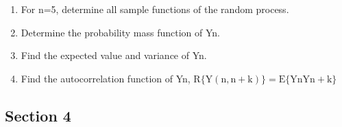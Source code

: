 \documentclass[main.tex]{subfiles}
\begin{document}
\begin{enumerate}
    \begin{enumerate}
        \item For n=5, determine all sample functions of the random process.
        \item Determine the probability mass function of Yn.
        \item Find the expected value and variance of Yn.
        \item Find the autocorrelation function of Yn, $\mathrm{R}\{\mathrm{Y}(\mathrm{n}, \mathrm{n}+\mathrm{k})\}=\mathrm{E}\{\mathrm{Yn} \mathrm{Yn}+\mathrm{k}\}$
    \end{enumerate}
    
\subsection{Section 4}
	
\end{enumerate}
\end{document}

